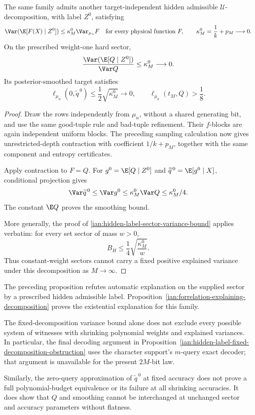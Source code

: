 \begin{proposition}\label{ian:forrelation-nonexplaining-decomposition}
The same family admits another target-independent hidden admissible \(\mathcal U\)-decomposition, with label \(Z^0\), satisfying
\[
 \Var(\E[F(X)\mid Z^0])
 \le\kappa_M^0\Var_{\mu_n}F
 \quad\text{for every physical function }F,\qquad
 \kappa_M^0=\frac1k+p_M\longrightarrow0.
\]
On the prescribed weight-one hard sector,
\[
 \frac{\Var(\E[Q\mid Z^0])}{\Var Q}\le\kappa_M^0\longrightarrow0.
\]
Its posterior-smoothed target satisfies
\[
 \ell_{\mu_n}(0,\widetilde q^{\,0})
 \le\frac12\sqrt{\kappa_M^0}\longrightarrow0,
 \qquad
 \ell_{\mu_n}(t_M,Q)>\frac18.
\]
\end{proposition}
\begin{proof}
Draw the rows independently from \(\mu_n\), without a shared generating bit, and use the same good-tuple rule and bad-tuple refinement. Their \(f\)-blocks are again independent uniform blocks. The preceding sampling calculation now gives unrestricted-depth contraction with coefficient \(1/k+p_M\), together with the same component and entropy certificates.

Apply contraction to \(F=Q\). For
\(g^0=\E[Q\mid Z^0]\) and
\(\widetilde q^{\,0}=\E[g^0\mid X]\), conditional projection gives
\[
 \Var\widetilde q^{\,0}\le\Var g^0
 \le\kappa_M^0\Var Q\le\kappa_M^0/4.
\]
The constant \(\E Q\) proves the smoothing bound.

More generally, the proof of
\eqref{ian:hidden-label-sector-variance-bound} applies verbatim:
for every set sector of mass \(w>0\),
\[
 B_H\le\frac14\sqrt{\frac{\kappa_M^0}{w}}.
\]
Thus constant-weight sectors cannot carry a fixed positive explained variance under this decomposition as \(M\to\infty\).
\end{proof}

\begin{remark}\label{ian:forrelation-decomposition-quantifiers}
The preceding proposition refutes automatic explanation on the supplied sector by a prescribed hidden admissible label. Proposition~\ref{ian:forrelation-explaining-decomposition} proves the existential explanation for this family.

The fixed-decomposition variance bound alone does not exclude every possible system of witnesses with shrinking polynomial weights and explained variances. In particular, the final decoding argument in Proposition~\ref{ian:hidden-label-fixed-decomposition-obstruction} uses the character support's \(m\)-query exact decoder; that argument is unavailable for the present \(2M\)-bit law.

Similarly, the zero-query approximation of \(\widetilde q^{\,0}\) at fixed accuracy does not prove a full polynomial-budget equivalence or its failure at all shrinking accuracies. It does show that \(Q\) and smoothing cannot be interchanged at unchanged sector and accuracy parameters without flatness.
\end{remark}

